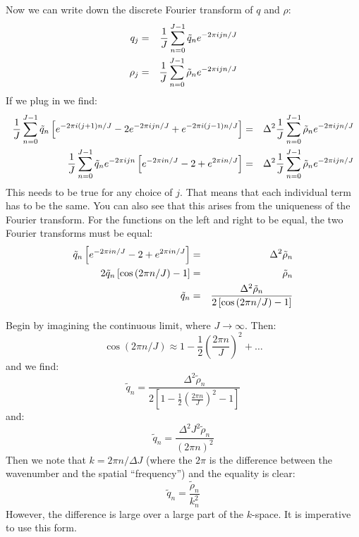 Now we can write down the discrete Fourier transform of $q$ and $\rho$:
\begin{eqnarray}
q_j &=& \frac{1}{J} \sum_{n=0}^{J-1} {\tilde q}_n e^{-2\pi i j n /J} \cr
\rho_j &=& \frac{1}{J} \sum_{n=0}^{J-1} {\tilde \rho}_n e^{-2\pi i j n /J}
\end{eqnarray}
If we plug in we find:
\begin{eqnarray}
\frac{1}{J}\sum_{n=0}^{J-1} {\tilde q}_n
\left[
e^{-2\pi i (j+1) n / J}
- 2 e^{-2\pi i j n / J}
+ e^{- 2\pi i (j-1) n / J}
\right] &=&\Delta^2 
\frac{1}{J}\sum_{n=0}^{J-1} {\tilde \rho}_n
e^{-2\pi i j n / J} \cr
\frac{1}{J}\sum_{n=0}^{J-1} {\tilde q}_n
e^{-2\pi i j n}
\left[
e^{-2 \pi i n / J}
- 2 
+ e^{2\pi i n / J}
\right] &=&
\Delta^2 \frac{1}{J}\sum_{n=0}^{J-1} {\tilde \rho}_n
e^{-2\pi i j n / J}
\end{eqnarray}
This needs to be true for any choice of $j$. That means that each
individual term has to be the same. You can also see that this arises
from the uniqueness of the Fourier transform. For the functions on the
left and right to be equal, the two Fourier transforms must be equal:
\begin{eqnarray}
{\tilde q}_n 
\left[
e^{-2 \pi i n / J}
- 2 
+ e^{2\pi i n / J}
\right] &=& \Delta^2 {\tilde \rho}_n \cr
2 {\tilde q}_n 
\left[
\cos\left(2\pi n/J\right)
- 1 
\right] &=& {\tilde \rho}_n \cr
{\tilde q}_n &=& \frac{\Delta^2 {\tilde \rho}_n}{2
\left[ \cos\left(2\pi n/J\right) - 1 \right]}
\end{eqnarray}


\begin{answer}
Begin by imagining the continuous limit, where
$J\rightarrow\infty$. Then:
\begin{equation}
\cos\left(2\pi n/J\right) \approx 1 - \frac{1}{2} \left(\frac{2\pi
n}{J}\right)^2 + \ldots
\end{equation}
and we find:
\begin{equation}
{\tilde q}_n = \frac{\Delta^2 {\tilde \rho}_n}{2
\left[1 - \frac{1}{2} \left(\frac{2\pi
n}{J}\right)^2 -1 \right]}
\end{equation}
and:
\begin{equation}
{\tilde q}_n = \frac{\Delta^2 J^2 {\tilde \rho}_n}{
(2\pi n)^2}
\end{equation}
Then we note that $k= 2\pi n/\Delta J$ (where the $2\pi$ is the
difference between the wavenumber and the spatial ``frequency'') and
the equality is clear:
\begin{equation}
{\tilde q}_n = \frac{{\tilde \rho}_n}{k_n^2}
\end{equation}
However, the difference is large over a large part of the
$k$-space. It is imperative to use this form.
\end{answer}

